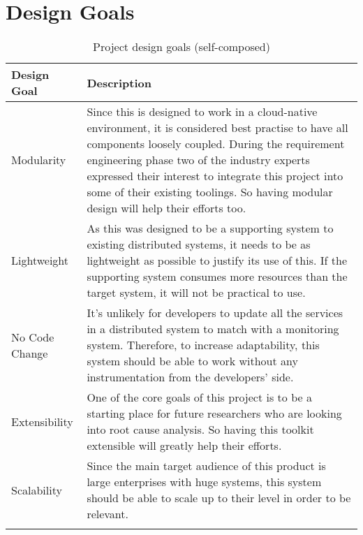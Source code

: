 \section{Design Goals}
\begin{longtable}{|p{22mm}|p{131mm}|}
\hline
\textbf{Design Goal} &
    \textbf{Description} \\ \hline
    Modularity &
    Since this is designed to work in a cloud-native environment, it is considered best practise to have all components loosely coupled. During the requirement engineering phase two of the industry experts expressed their interest to integrate this project into some of their existing toolings. So having modular design will help their efforts too. \\ \hline
    
    Lightweight &
    As this was designed to be a supporting system to existing distributed systems, it needs to be as lightweight as possible to justify its use of this. If the supporting system consumes more resources than the target system, it will not be practical to use. \\ \hline
    
    No Code Change &
    It’s unlikely for developers to update all the services in a distributed system to match with a monitoring system. Therefore, to increase adaptability, this system should be able to work without any instrumentation from the developers' side. \\ \hline
    
    Extensibility &
    One of the core goals of this project is to be a starting place for future researchers who are looking into root cause analysis. So having this toolkit extensible will greatly help their efforts. \\ \hline
    
    Scalability &
    Since the main target audience of this product is large enterprises with huge systems, this system should be able to scale up to their level in order to be relevant. \\ \hline

    \caption{Project design goals (self-composed)}
\end{longtable}